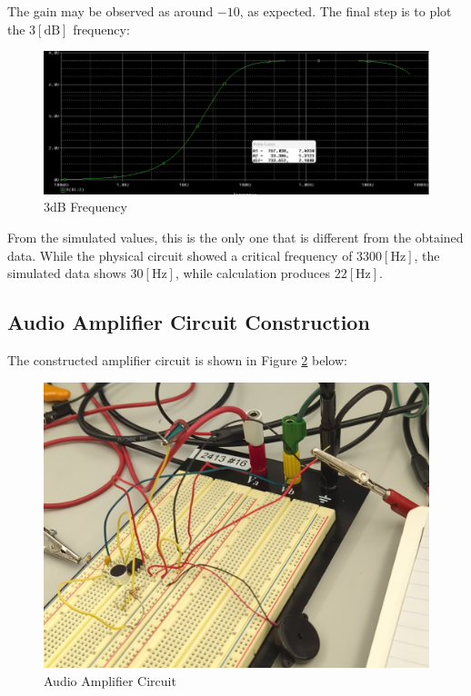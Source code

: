 \documentclass[
	letterpaper, %
	10pt, %
]{CSUniSchoolLabReport}
\begin{document}
The gain may be observed as around $-10$, as expected. The final step is to plot the $3[\text{dB}]$ frequency:

\begin{figure}[H]
  \centering
  \includegraphics[width=.9\textwidth]{Figures/L1D5.png}
  \caption{3dB Frequency}
  \label{fig:14}
\end{figure}

From the simulated values, this is the only one that is different from the obtained data. While the physical circuit showed a critical frequency of $3300[\si{\hertz}]$, the simulated data shows $30[\si{\hertz}]$, while calculation produces $22[\si{\hertz}]$.

\subsection{Audio Amplifier Circuit Construction}

The constructed amplifier circuit is shown in Figure \ref{fig:15} below:

\begin{figure}[H]
  \centering
  \includegraphics[width=.9\textwidth]{Figures/L1F3.jpg}
  \caption{Audio Amplifier Circuit}
  \label{fig:15}
\end{figure}
\end{document}
